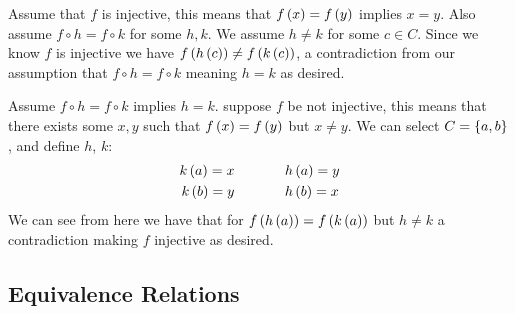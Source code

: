 \begin{mdframed}[style=darkAnswer,frametitle={Joe Starr}]
  Assume that $f$ is injective, this means that $f\left(x\right)=f\left(y\right)$ implies $x=y$.
  Also assume $f\circ h=f\circ k$ for some $h,k$. We assume $h\neq k$ for some
  $c\in C$. Since we know $f$ is injective we have
  $f\left(h\left(c\right)\right)\neq f\left(k\left(c\right)\right)$, a contradiction from our assumption that
  $f\circ h=f\circ k$ meaning $h=k$ as desired.

  Assume $f\circ h=f\circ k$ implies $h=k$. suppose $f$ be not injective, this means
  that there exists some $x,y$ such that $f\left(x\right)=f\left(y\right)$ but $x\neq y$.
  We can select $C=\left\{a,b\right\}$, and define $h$, $k$:
  \begin{align*}
    k\left(a\right)=x & \hspace{.5in}  h\left(a\right)=y \\
    k\left(b\right)=y & \hspace{.5in} h\left(b\right)=x
  \end{align*}
  We can see from here we have that for $f\left(h\left(a\right)\right)=f\left(k\left(a\right)\right)$ but
  $h\neq k$ a contradiction making $f$ injective as desired.
\end{mdframed}
\newpage
\subsection{Equivalence Relations}
\newpage
